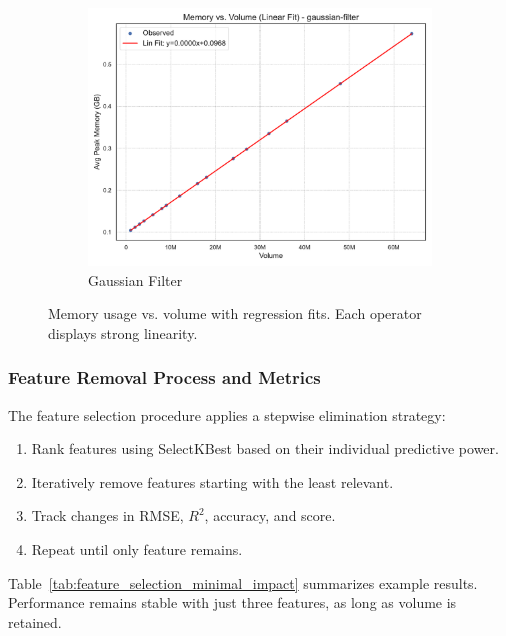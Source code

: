 \begin{figure}[htbp]
\begin{subfigure}[t]{0.32\textwidth}
        \includegraphics[width=\textwidth]{assets/images/05/memory_vs_volume_regression_gaussian-filter}
        \caption{Gaussian Filter}
    \end{subfigure}
    \caption{Memory usage vs. volume with regression fits. Each operator displays strong linearity.}
    \label{fig:memory_vs_volume_regression_subplots}
\end{figure}

\subsubsection{Feature Removal Process and Metrics}
\label{subsec:feature-removal-methods-and-metrics}

The feature selection procedure applies a stepwise elimination strategy:

\begin{enumerate}
    \item Rank features using SelectKBest based on their individual predictive power.
    \item Iteratively remove features starting with the least relevant.
    \item Track changes in \ac{RMSE}, $R^2$, accuracy, and score.
    \item Repeat until only feature remains.
\end{enumerate}

Table~\ref{tab:feature_selection_minimal_impact} summarizes example results.
Performance remains stable with just three features, as long as volume is retained.

